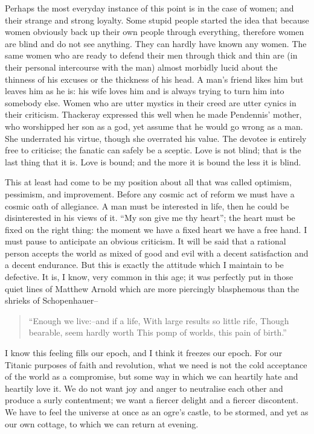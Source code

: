 \documentclass{book}
\newenvironment{mdblockquote}{%
  \begin{quotation}
    \itshape
}{%
  \end{quotation}
}
\begin{document}
Perhaps the most everyday instance of this point is in the case of women; and their strange and strong loyalty. Some stupid people started the idea that because women obviously back up their own people through everything, therefore women are blind and do not see anything. They can hardly have known any women. The same women who are ready to defend their men through thick and thin are (in their personal intercourse with the man) almost morbidly lucid about the thinness of his excuses or the thickness of his head. A man’s friend likes him but leaves him as he is: his wife loves him and is always trying to turn him into somebody else. Women who are utter mystics in their creed are utter cynics in their criticism. Thackeray expressed this well when he made Pendennis’ mother, who worshipped her son as a god, yet assume that he would go wrong as a man. She underrated his virtue, though she overrated his value. The devotee is entirely free to criticise; the fanatic can safely be a sceptic. Love is not blind; that is the last thing that it is. Love is bound; and the more it is bound the less it is blind.

This at least had come to be my position about all that was called optimism, pessimism, and improvement. Before any cosmic act of reform we must have a cosmic oath of allegiance. A man must be interested in life, then he could be disinterested in his views of it. “My son give me thy heart”; the heart must be fixed on the right thing: the moment we have a fixed heart we have a free hand. I must pause to anticipate an obvious criticism. It will be said that a rational person accepts the world as mixed of good and evil with a decent satisfaction and a decent endurance. But this is exactly the attitude which I maintain to be defective. It is, I know, very common in this age; it was perfectly put in those quiet lines of Matthew Arnold which are more piercingly blasphemous than the shrieks of Schopenhauer–

\begin{mdblockquote}
“Enough we live:–and if a life, With large results so little rife, Though bearable, seem hardly worth This pomp of worlds, this pain of birth.”


\end{mdblockquote}
I know this feeling fills our epoch, and I think it freezes our epoch. For our Titanic purposes of faith and revolution, what we need is not the cold acceptance of the world as a compromise, but some way in which we can heartily hate and heartily love it. We do not want joy and anger to neutralise each other and produce a surly contentment; we want a fiercer delight and a fiercer discontent. We have to feel the universe at once as an ogre’s castle, to be stormed, and yet as our own cottage, to which we can return at evening.
\end{document}
